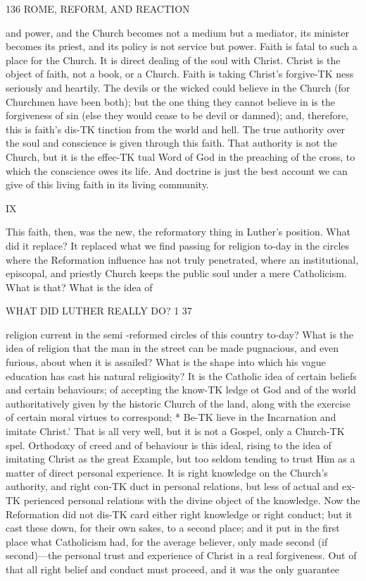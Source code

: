 \documentclass[12pt,a5paper,twoside]{book}
\begin{document}
{136 ROME, REFORM, AND REACTION 

and power, and the Church becomes not a medium 
but a mediator, its minister becomes its priest, and its 
policy is not service but power. Faith is fatal to such 
a place for the Church. It is direct dealing of the 
soul with Christ. Christ is the object of faith, not a 
book, or a Church. Faith is taking Christ's forgive-TK
ness seriously and heartily. The devils or the wicked 
could believe in the Church (for Churchmen have 
been both); but the one thing they cannot believe in 
is the forgiveness of sin (else they would cease to be 
devil or damned); and, therefore, this is faith's dis-TK
tinction from the world and hell. The true authority 
over the soul and conscience is given through this faith. 
That authority is not the Church, but it is the effec-TK
tual Word of God in the preaching of the cross, to 
which the conscience owes its life. And doctrine is 
just the best account we can give of this living faith 
in its living community. 

IX 

This faith, then, was the new, the reformatory 
thing in Luther's position. What did it replace? 
It replaced what we find passing for religion to-day in 
the circles where the Reformation influence has not 
truly penetrated, where an institutional, episcopal, and 
priestly Church keeps the public soul under a mere 
Catholicism. What is that? What is the idea of 



WHAT DID LUTHER REALLY DO? 1 37 

religion current in the semi -reformed circles of this 
country to-day? What is the idea of religion that 
the man in the street can be made pugnacious, and 
even furious, about when it is assailed? What is the 
shape into which his vague education has cast his 
natural religiosity? It is the Catholic idea of certain 
beliefs and certain behaviours; of accepting the know-TK
ledge ot God and of the world authoritatively given 
by the historic Church of the land, along with the 
exercise of certain moral virtues to correspond; * Be-TK
lieve in the Incarnation and imitate Christ.' That is 
all very well, but it is not a Gospel, only a Church-TK
spel. Orthodoxy of creed and of behaviour is this 
ideal, rising to the idea of imitating Christ as the 
great Example, but too seldom tending to trust Him 
as a matter of direct personal experience. It is right 
knowledge on the Church's authority, and right con-TK
duct in personal relations, but less of actual and ex-TK
perienced personal relations with the divine object of 
the knowledge. Now the Reformation did not dis-TK
card either right knowledge or right conduct; but 
it cast these down, for their own sakes, to a second 
place; and it put in the first place what Catholicism 
had, for the average believer, only made second (if 
second)---the personal trust and experience of Christ 
in a real forgiveness. Out of that all right belief and 
conduct must proceed, and it was the only guarantee 



}
\end{document}

